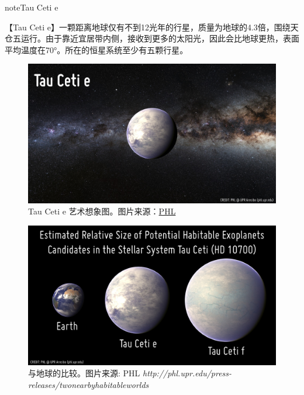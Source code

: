 \documentclass[letterpaper,10pt,english]{sphinxmanual}
\begin{document}
\begin{notice}{note}{Tau Ceti e}

【Tau Ceti e】一颗距离地球仅有不到12光年的行星，质量为地球的4.3倍，围绕天仓五运行。由于靠近宜居带内侧，接收到更多的太阳光，因此会比地球更热，表面平均温度在70°。所在的恒星系统至少有五颗行星。
\begin{figure}[htbp]
\centering
\capstart

\includegraphics{HEC_HD10700e.jpg}
\caption{Tau Ceti e 艺术想象图。图片来源：\href{http://phl.upr.edu/press-releases/twonearbyhabitableworlds}{PHL}}\end{figure}
\begin{figure}[htbp]
\centering
\capstart

\includegraphics{HEC_HD10700ef_Comparison.jpg}
\caption{与地球的比较。图片来源: PHL \emph{http://phl.upr.edu/press-releases/twonearbyhabitableworlds}}\end{figure}
\end{notice}
\end{document}
